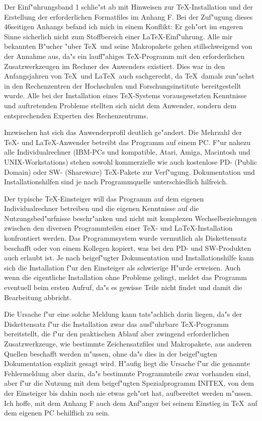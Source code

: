 \documentclass[twoside]{article}
\begin{document}
Der Einf"uhrungsband 1 schlie"st ab mit Hinweisen zur \TeX-Installation und der
Erstellung der erforderlichen Formatfiles im Anhang F. 
Bei der Zuf"ugung dieses 46seitigen Anhangs befand ich mich in einem Konflikt:
Er geh"ort im engeren Sinne sicherlich nicht zum Stoffbereich einer 
\LaTeX-Einf"uhrung.
Alle mir bekannten B"ucher "uber \TeX\ und seine Makropakete gehen
stillschweigend von der Annahme aus, da"s ein lauff"ahiges \TeX-Programm
mit den erforderlichen Zusatzwerkzeugen im Rechner des Anwenders existiert.
Dies war in den Anfangsjahren von \TeX\ und \LaTeX\ auch sachgerecht, da
\TeX\ damals zun"achst in den Rechenzentren der Hochschulen und 
Forschungsinstitute bereitgestellt wurde. Alle bei der Installation eines
\TeX-Systems vorausgesetzten Kenntnisse und auftretenden Probleme stellten
sich nicht dem Anwender, sondern dem entsprechenden Experten des
Rechenzentrums.

Inzwischen hat sich das Anwenderprofil deutlich ge"andert. Die Mehrzahl
der \TeX- und \LaTeX-Anwender betreibt das Programm auf einem PC. 
F"ur nahezu alle Individualrechner (IBM-PCs und kompatible, Atari, Amiga,
Macintosh und UNIX-Workstations) stehen sowohl kommerzielle wie auch
kostenlose PD- (Public Domain) oder SW- (Shareware) \TeX-Pakete zur 
Verf"ugung. Dokumentation und Installationshilfen sind je nach Programmquelle
unterschiedlich hilfreich. 

Der typische \TeX-Einsteiger will das Programm auf dem eigenen 
Individualrechner betreiben und die eigenen Kenntnisse auf die 
Nutzungsbed"urfnisse beschr"anken und nicht mit komplexen Wechselbeziehungen
zwischen den diversen Programmteilen einer \TeX- und \LaTeX-Installation
konfrontiert werden. Das Programmsystem wurde vermutlich als Diskettensatz
beschafft oder von einem Kollegen kopiert, was bei den PD- und SW-Produkten
auch erlaubt ist. Je nach beigef"ugter Dokumentation und Installationshilfe
kann sich die Installation f"ur den Einsteiger als schwierige H"urde erweisen.
Auch wenn die eigentliche Installation ohne Probleme gelingt, meldet das
Programm eventuell beim ersten Aufruf, da"s es gewisse Teile nicht findet und
damit die Bearbeitung abbricht.          

Die Ursache f"ur eine solche Meldung kann tats"achlich darin liegen, da"s
der Diskettensatz f"ur die Installation zwar das ausf"uhrbare \TeX-Programm
bereitstellt, die f"ur den praktischen Ablauf aber zwingend erforderlichen
Zusatzwerkzeuge, wie bestimmte Zeichensatzfiles und Makropakete, aus anderen
Quellen beschafft werden m"ussen, ohne da"s dies in der beigef"ugten
Dokumentation explizit gesagt wird. H"aufig liegt die Ursache f"ur die
genannte Fehlermeldung aber darin, da"s bestimmte Programmteile zwar vorhanden
sind, aber f"ur die Nutzung mit dem beigef"ugten Spezialprogramm INITEX, 
von dem der Einsteiger bis dahin noch nie etwas geh"ort hat, aufbereitet werden
m"ussen.  Ich hoffe, mit dem Anhang F auch dem Anf"anger 
bei seinem Einstieg in \TeX\ auf dem eigenen PC behilflich  zu sein.
\end{document}
